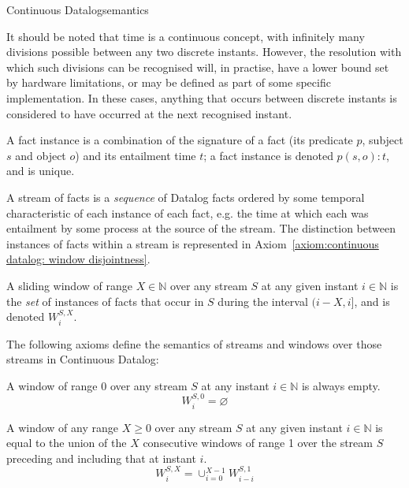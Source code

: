 \begin{nestedsection}{Continuous Datalog}{semantics}
\begin{definition}[Instant]
It should be noted that time is a continuous concept, with infinitely many divisions possible between any two discrete instants.
However, the resolution with which such divisions can be recognised will, in practise, have a lower bound set by hardware limitations, or may be defined as part of some specific implementation.
In these cases, anything that occurs between discrete instants is considered to have occurred at the next recognised instant.
\end{definition}

\begin{definition}\label{def:continuous datalog: fact instance}
A fact instance is a combination of the signature of a fact (its
predicate $p$, subject $s$ and object $o$) and its entailment time
$t$; a fact instance is denoted ${p(s,o):t}$, and is unique.
\end{definition}

\begin{definition}\label{def:continuous datalog: stream}
A stream of facts is a \emph{sequence} of Datalog facts ordered by
some temporal characteristic of each instance of each fact, e.g. the
time at which each was entailment by some process at the source of the
stream.  The distinction between instances of facts within a
stream is represented in Axiom~\ref{axiom:continuous datalog: window disjointness}.
\end{definition}

\begin{definition}\label{def:continuous datalog: window}
A sliding window of range ${X \in \mathbb{N}}$ over any stream $S$ at
any given instant ${i \in \mathbb{N}}$ is the \emph{set} of instances
of facts that occur in $S$ during the interval ${(i-X,i]}$, and is
  denoted ${W^{S,X}_{i}}$.
\end{definition}

The following axioms define the semantics of streams and windows over
those streams in Continuous Datalog:

\begin{axiom}\label{axiom:continuous datalog: window range leq 0}
A window of range $0$ over any stream $S$ at any instant 
${i \in \mathbb{N}}$ is always empty.
\begin{equation*}
W^{S,0}_{i} = \varnothing
\end{equation*}
\end{axiom}

\begin{axiom}\label{axiom:continuous datalog: window composition}
A window of any range ${X \ge 0}$ over any stream $S$ at any
given instant ${i \in \mathbb{N}}$ is equal to the union of the
$X$ consecutive windows of range 1 over the stream $S$ preceding and
including that at instant $i$.
\begin{equation*}
W^{S,X}_{i} = \mathop{\cup}_{i=0}^{X-1} W^{S,1}_{i-i}
\end{equation*}
\end{axiom}


\end{nestedsection}
